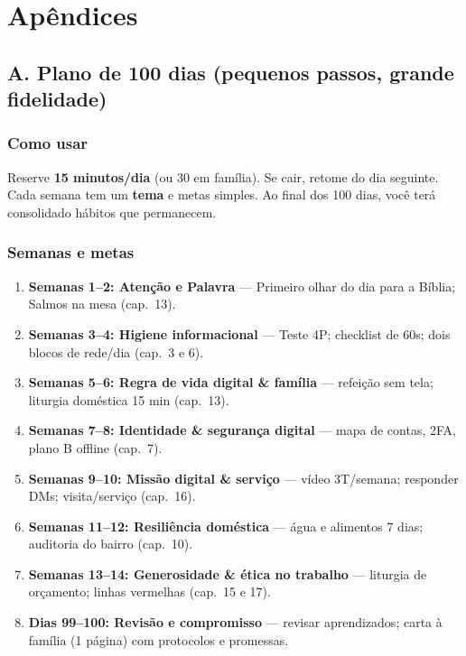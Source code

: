 
\chapter*{Apêndices}

\section*{A. Plano de 100 dias (pequenos passos, grande fidelidade)}
\subsection*{Como usar}
Reserve \textbf{15 minutos/dia} (ou 30 em família). Se cair, retome do dia seguinte. Cada semana tem um \textbf{tema} e metas simples. Ao final dos 100 dias, você terá consolidado hábitos que permanecem.

\subsection*{Semanas e metas}
\begin{enumerate}[leftmargin=*,nosep]
  \item \textbf{Semanas 1--2: Atenção e Palavra} — Primeiro olhar do dia para a Bíblia; Salmos na mesa (cap.~13).
  \item \textbf{Semanas 3--4: Higiene informacional} — Teste 4P; checklist de 60s; dois blocos de rede/dia (cap.~3 e 6).
  \item \textbf{Semanas 5--6: Regra de vida digital \& família} — refeição sem tela; liturgia doméstica 15 min (cap.~13).
  \item \textbf{Semanas 7--8: Identidade \& segurança digital} — mapa de contas, 2FA, plano B offline (cap.~7).
  \item \textbf{Semanas 9--10: Missão digital \& serviço} — vídeo 3T/semana; responder DMs; visita/serviço (cap.~16).
  \item \textbf{Semanas 11--12: Resiliência doméstica} — água e alimentos 7 dias; auditoria do bairro (cap.~10).
  \item \textbf{Semanas 13--14: Generosidade \& ética no trabalho} — liturgia de orçamento; linhas vermelhas (cap.~15 e 17).
  \item \textbf{Dias 99--100: Revisão e compromisso} — revisar aprendizados; carta à família (1 página) com protocolos e promessas.
\end{enumerate}

